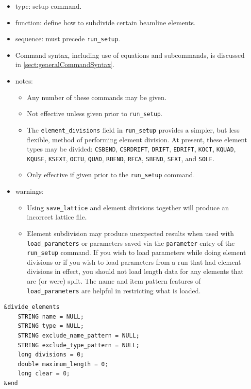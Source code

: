 \documentclass[11pt]{article}
\begin{document}
\begin{itemize}
\item type: setup command.
\item function: define how to subdivide certain beamline elements.
\item sequence: must precede \verb|run_setup|.
\item Command syntax, including use of equations and subcommands, is discussed in \ref{sect:generalCommandSyntax}.
\item notes: 
	\begin{itemize}
	\item Any number of these commands may be given.  
	\item Not effective unless given prior to \verb|run_setup|.
	\item The \verb|element_divisions|
 field in \verb|run_setup| provides a simpler, but less flexible, method of performing
 element division.  At present, these element types may be divided: 
\verb|CSBEND|, 
\verb|CSRDRIFT|,
\verb|DRIFT|,
\verb|EDRIFT|,
\verb|KOCT|,
\verb|KQUAD|,
\verb|KQUSE|,
\verb|KSEXT|,
\verb|OCTU|,
\verb|QUAD|,
\verb|RBEND|,
\verb|RFCA|,
\verb|SBEND|,
\verb|SEXT|,
and \verb|SOLE|.
	\item Only effective if given prior to the \verb|run_setup| command.
	\end{itemize}
\item warnings:	
	\begin{itemize}
	\item Using \verb|save_lattice| and element divisions together will
	produce an incorrect lattice file.
	\item Element subdivision may
	produce unexpected results when used with \verb|load_parameters|
	or parameters saved via the \verb|parameter|
	entry of the \verb|run_setup| command.
	If you wish to load parameters while doing element divisions or if
	you wish to load parameters from a run that had element divisions
	in effect, you should not load length data for any elements that
	are (or were) split.  The name and item pattern features of 
	\verb|load_parameters| are helpful in restricting what is loaded.
	\end{itemize}
\end{itemize}

\begin{verbatim}
&divide_elements
    STRING name = NULL;
    STRING type = NULL;
    STRING exclude_name_pattern = NULL;
    STRING exclude_type_pattern = NULL;
    long divisions = 0;
    double maximum_length = 0;
    long clear = 0;
&end
\end{verbatim}
\end{document}
